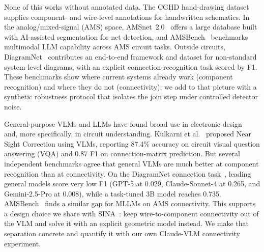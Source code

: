 \documentclass[journal]{IEEEtran}
\begin{document}
None of this works without annotated data. The CGHD hand-drawing dataset~\cite{bayer2021cghd} supplies component- and wire-level annotations for handwritten schematics. In the analog/mixed-signal (AMS) space, AMSnet~2.0~\cite{amsnet2025} offers a large database built with AI-assisted segmentation for net detection, and AMSBench~\cite{amsbench2025} benchmarks multimodal LLM capability across AMS circuit tasks. Outside circuits, DiagramNet~\cite{diagramnet2026} contributes an end-to-end framework and dataset for non-standard system-level diagrams, with an explicit connection-recognition task scored by F1. These benchmarks show where current systems already work (component recognition) and where they do not (connectivity); we add to that picture with a synthetic robustness protocol that isolates the join step under controlled detector noise.

\label{sec:vlm_connectivity}
General-purpose VLMs and LLMs have found broad use in electronic design~\cite{llm4eda2024} and, more specifically, in circuit understanding. Kulkarni et al.~\cite{kulkarni2025enhancing} proposed Near Sight Correction using VLMs, reporting 87.4\% accuracy on circuit visual question answering (VQA) and 0.87 F1 on connection-matrix prediction. But several independent benchmarks agree that general VLMs are much better at component recognition than at connectivity. On the DiagramNet connection task~\cite{diagramnet2026}, leading general models score very low F1 (GPT-5 at 0.029, Claude-Sonnet-4 at 0.265, and Gemini-2.5-Pro at 0.008), while a task-tuned 3B model reaches 0.735. AMSBench~\cite{amsbench2025} finds a similar gap for MLLMs on AMS connectivity. This supports a design choice we share with SINA~\cite{sina2026}: keep wire-to-component connectivity out of the VLM and solve it with an explicit geometric model instead. We make that separation concrete and quantify it with our own Claude-VLM connectivity experiment.
\end{document}
